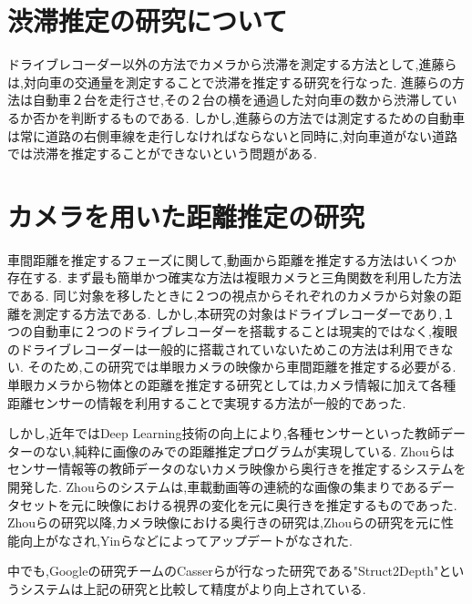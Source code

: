 \newpage

\section{渋滞推定の研究について}
ドライブレコーダー以外の方法でカメラから渋滞を測定する方法として,進藤ら\cite{進藤瞭2013車載カメラ画像を用いた対向車線の渋滞状況の把握手法}は,対向車の交通量を測定することで渋滞を推定する研究を行なった.
進藤らの方法は自動車２台を走行させ,その２台の横を通過した対向車の数から渋滞しているか否かを判断するものである.
しかし,進藤らの方法では測定するための自動車は常に道路の右側車線を走行しなければならないと同時に,対向車道がない道路では渋滞を推定することができないという問題がある.

\section{カメラを用いた距離推定の研究}
車間距離を推定するフェーズに関して,動画から距離を推定する方法はいくつか存在する.
まず最も簡単かつ確実な方法は複眼カメラと三角関数を利用した方法である.
同じ対象を移したときに２つの視点からそれぞれのカメラから対象の距離を測定する方法である.
しかし,本研究の対象はドライブレコーダーであり,１つの自動車に２つのドライブレコーダーを搭載することは現実的ではなく,複眼のドライブレコーダーは一般的に搭載されていないためこの方法は利用できない.
そのため,この研究では単眼カメラの映像から車間距離を推定する必要がる.
単眼カメラから物体との距離を推定する研究としては,カメラ情報に加えて各種距離センサーの情報を利用することで実現する方法が一般的であった.

しかし,近年ではDeep Learning技術の向上により,各種センサーといった教師データーのない,純粋に画像のみでの距離推定プログラムが実現している.
Zhouら\cite{zhou2017unsupervised}はセンサー情報等の教師データのないカメラ映像から奥行きを推定するシステムを開発した.
Zhouらのシステムは,車載動画等の連続的な画像の集まりであるデータセットを元に映像における視界の変化を元に奥行きを推定するものであった.
Zhouらの研究以降,カメラ映像における奥行きの研究は,Zhouらの研究を元に性能向上がなされ,Yinら\cite{yin2018geonet}などによってアップデートがなされた.

中でも,Googleの研究チームのCasserらが行なった研究である"Struct2Depth"\cite{casser2019struct2depth}というシステムは上記の研究と比較して精度がより向上されている.

\newpage

